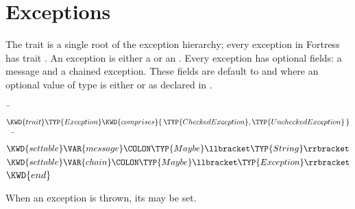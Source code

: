 %
%
%
%

\chapter{Exceptions}


The trait  is a single root of the exception hierarchy;
every exception in Fortress has trait .
An exception is either a  or an
.
Every exception has optional fields: a message and a chained exception.
These fields are default to
 and
where an optional value  of type 
is either  or
 as declared in .


\begin{Fortress}
{\tt~}\pushtabs\=\+\( \KWD{trait} \TYP{Exception} \KWD{comprises} \{\,\TYP{CheckedException}, \TYP{UncheckedException}\,\}\)\\
{\tt~~}\pushtabs\=\+\(   \KWD{settable} \VAR{message}\COLON \TYP{Maybe}\llbracket\TYP{String}\rrbracket\)\\
\(   \KWD{settable} \VAR{chain}\COLON \TYP{Maybe}\llbracket\TYP{Exception}\rrbracket\)\-\\\poptabs
\( \KWD{end}\)\-\\\poptabs
\end{Fortress}


When an exception is thrown, its  may be set. 


